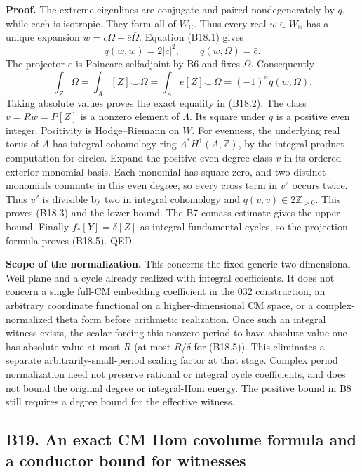\documentclass[11pt,a4paper]{article}
\theoremstyle{definition}
\begin{document}
\textbf{Proof.} The extreme eigenlines are conjugate and paired nondegenerately by \(q\), while each is isotropic. They form all of \(W_\mathbb C\). Thus every real \(w\in W_\mathbb R\) has a unique expansion \(w=c\Omega+\bar c\overline\Omega\). Equation (B18.1) gives \[
 q(w,w)=2|c|^2,\qquad q(w,\Omega)=\bar c.
\] The projector \(e\) is Poincare-selfadjoint by B6 and fixes \(\Omega\). Consequently \[
 \int_Z\Omega
 =\int_A[Z]\smile\Omega
 =\int_Ae[Z]\smile\Omega
 =(-1)^nq(w,\Omega).
\] Taking absolute values proves the exact equality in (B18.2). The class \(v=Rw=P[Z]\) is a nonzero element of \(\Lambda\). Its square under \(q\) is a positive even integer. Positivity is Hodge--Riemann on \(W\). For evenness, the underlying real torus of \(A\) has integral cohomology ring \(\Lambda^*H^1(A,\mathbb Z)\), by the integral product computation for circles. Expand the positive even-degree class \(v\) in its ordered exterior-monomial basis. Each monomial has square zero, and two distinct monomials commute in this even degree, so every cross term in \(v^2\) occurs twice. Thus \(v^2\) is divisible by two in integral cohomology and \(q(v,v)\in2\mathbb Z_{>0}\). This proves (B18.3) and the lower bound. The B7 comass estimate gives the upper bound. Finally \(f_*[Y]=\delta[Z]\) as integral fundamental cycles, so the projection formula proves (B18.5). QED.

\textbf{Scope of the normalization.} This concerns the fixed generic two-dimensional Weil plane and a cycle already realized with integral coefficients. It does not concern a single full-CM embedding coefficient in the 032 construction, an arbitrary coordinate functional on a higher-dimensional CM space, or a complex-normalized theta form before arithmetic realization. Once such an integral witness exists, the scalar forcing this nonzero period to have absolute value one has absolute value at most \(R\) (at most \(R/\delta\) for (B18.5)). This eliminates a separate arbitrarily-small-period scaling factor at that stage. Complex period normalization need not preserve rational or integral cycle coefficients, and does not bound the original degree or integral-Hom energy. The positive bound in B8 still requires a degree bound for the effective witness.

\subsection{B19. An exact CM Hom covolume formula and a conductor bound for witnesses}\label{b19.-an-exact-cm-hom-covolume-formula-and-a-conductor-bound-for-witnesses}
\end{document}
